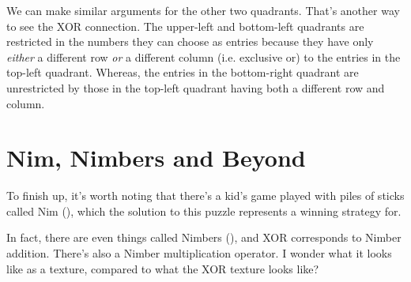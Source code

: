 \documentclass[11pt]{article}
\begin{document}
We can make similar arguments for the other two quadrants. That's another way to see the XOR connection. The upper-left and bottom-left quadrants are restricted in the numbers they can choose as entries because they have only \emph{either} a different row \emph{or} a different column (i.e. exclusive or) to the entries in the top-left quadrant. Whereas, the entries in the bottom-right quadrant are unrestricted by those in the top-left quadrant having both a different row and column.
\section{Nim, Nimbers and Beyond}

To finish up, it's worth noting that there's a kid's game played with piles of sticks called Nim (\texttt{}), which the solution to this puzzle represents a winning strategy for.

In fact, there are even things called Nimbers (\texttt{}), and XOR corresponds to Nimber addition. There's also a Nimber multiplication operator. I wonder what it looks like as a texture, compared to what the XOR texture looks like?
\end{document}
